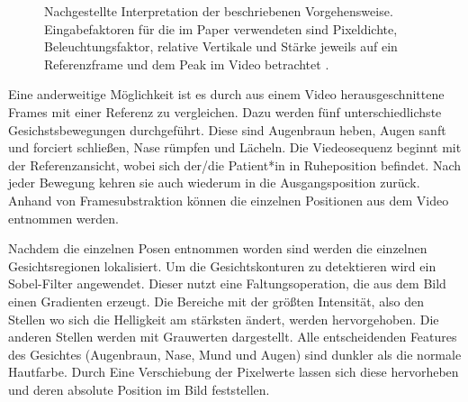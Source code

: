 \begin{figure}[!b]
\caption[Nachgestellte Interpretation der beschriebenen Vorgehensweise für]{Nachgestellte Interpretation der beschriebenen Vorgehensweise. Eingabefaktoren für die im Paper verwendeten sind Pixeldichte, Beleuchtungsfaktor, relative Vertikale und Stärke jeweils auf ein Referenzframe und dem Peak im Video betrachtet \cite{detection_fp1}.}\label{cap:paper_2}
\end{figure}\label{fig:paper_2}


Eine anderweitige Möglichkeit ist es durch aus einem Video herausgeschnittene Frames mit einer Referenz zu vergleichen. Dazu werden fünf unterschiedlichste Gesichstsbewegungen durchgeführt. Diese sind Augenbraun heben, Augen sanft und forciert schließen, Nase rümpfen und Lächeln. Die Viedeosequenz beginnt mit der Referenzansicht, wobei sich der/die Patient*in in Ruheposition befindet. Nach jeder Bewegung kehren sie auch wiederum in die Ausgangsposition zurück. Anhand von Framesubstraktion können die einzelnen Positionen aus dem Video entnommen werden.

Nachdem die einzelnen Posen entnommen worden sind werden die einzelnen Gesichtsregionen lokalisiert. Um die Gesichtskonturen zu detektieren wird ein Sobel-Filter angewendet. Dieser nutzt eine Faltungsoperation, die aus dem Bild einen Gradienten erzeugt. Die Bereiche mit der größten Intensität, also den Stellen wo sich die Helligkeit am stärksten ändert, werden hervorgehoben. Die anderen Stellen werden mit Grauwerten dargestellt. Alle entscheidenden Features des Gesichtes (Augenbraun, Nase, Mund und Augen) sind dunkler als die normale Hautfarbe. Durch Eine Verschiebung der Pixelwerte lassen sich diese hervorheben und deren absolute Position im Bild feststellen.

